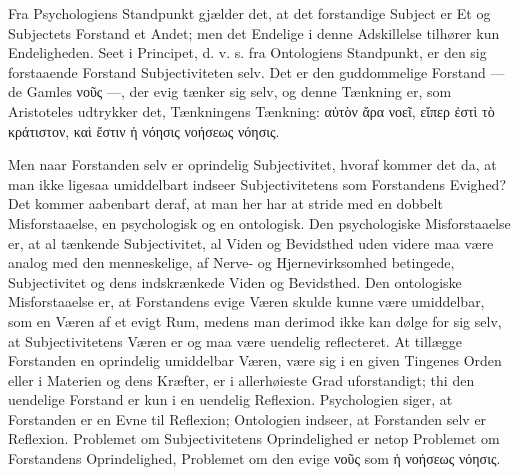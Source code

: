 \documentclass[11pt]{book}
\newcommand{\opage}[1]{\marginnote{\footnotesize\textit{[#1]}}}
\begin{document}
Fra Psychologiens Standpunkt gjælder det, at det forstandige Subject er Et
og Subjectets Forstand et Andet; men det Endelige i denne Adskillelse
tilhører kun Endeligheden. Seet i Principet, d. v. s. fra Ontologiens
Standpunkt, er
\opage{63} \setcounter{footnote}{0}%
den sig forstaaende Forstand Subjectiviteten selv. Det er den guddommelige
Forstand --- de Gamles νοῦς ---, der evig tænker sig selv, og denne
Tænkning er, som Aristoteles udtrykker det, Tænkningens Tænkning: αὐτὸν
ἄρα νοεῖ, εἴπερ ἐστὶ τὸ κράτιστον, καὶ ἔστιν ἡ νόησις νοήσεως νόησις.

Men naar Forstanden selv er oprindelig Subjectivitet, hvoraf kommer det da,
at man ikke ligesaa umiddelbart indseer Subjectivitetens som Forstandens
Evighed? Det kommer aabenbart deraf, at man her har at stride med en
dobbelt Misforstaaelse, en psychologisk og en ontologisk. Den psychologiske
Misforstaaelse er, at al tænkende Subjectivitet, al Viden og Bevidsthed
uden videre maa være analog med den menneskelige, af Nerve- og
Hjernevirksomhed betingede, Subjectivitet og dens indskrænkede Viden og
Bevidsthed. Den ontologiske Misforstaaelse er, at Forstandens evige Væren
skulde kunne være umiddelbar, som en Væren af et evigt Rum, medens man
derimod ikke kan dølge for sig selv, at Subjectivitetens Væren er og maa
være uendelig reflecteret. At tillægge Forstanden en oprindelig umiddelbar
Væren, være sig i en given Tingenes Orden eller i Materien og dens Kræfter,
er i allerhøieste Grad uforstandigt; thi den uendelige Forstand er kun i en
uendelig Reflexion. Psychologien siger, at Forstanden er en Evne til
Reflexion; Ontologien indseer, at Forstanden selv er Reflexion. Problemet
om Subjectivitetens Oprindelighed er netop Problemet om Forstandens
Oprindelighed, Problemet om den evige νοῦς som ἡ νοήσεως νόησις.
\end{document}
